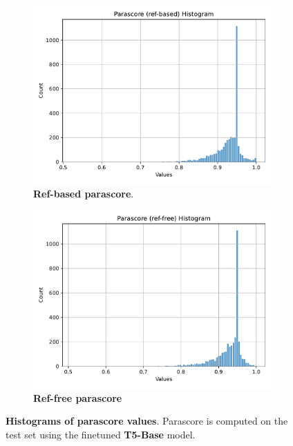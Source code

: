 \documentclass[fleqn,moreauthors,10pt]{ds_report}
\begin{document}
\begin{figure}[ht]
    \centering
    \begin{subfigure}{0.45\linewidth} %
        \centering
        \includegraphics[width=\textwidth]{t5-base-parascore-ref-based-hist.pdf}
        \caption{\textbf{Ref-based parascore}.}
        \label{fig:t5-base-parascore-ref-based-hist}
    \end{subfigure}
    \hfill %
    \begin{subfigure}{0.45\linewidth} %
        \centering
        \includegraphics[width=\textwidth]{t5-base-parascore-ref-free-hist.pdf}
        \caption{\textbf{Ref-free parascore}}
        \label{fig:t5-base-parascore-ref-free-hist}
    \end{subfigure}
    \caption{\textbf{Histograms of parascore values}. Parascore is computed on the test set using the finetuned \textbf{T5-Base} model.}
    \label{fig:t5-base-parascore-hist}
\end{figure}
\end{document}

